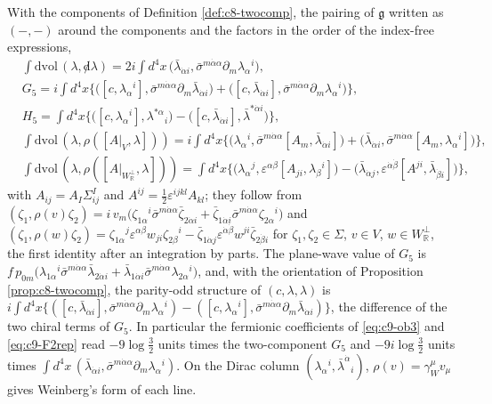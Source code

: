 \begin{remark}
\label{rem:c9-twocomp3}
With the components of Definition \ref{def:c8-twocomp}, the pairing of $\mathfrak g$ written as $(-,-)$ around the components and the factors in the order of the index-free expressions,
\[
\begin{aligned}
&\int\mathrm{dvol}\,(\lambda,{\not d}\lambda)=2i\int d^4x\,\big(\bar\lambda_{\dot\alpha i},\bar\sigma^{m\dot\alpha\alpha}\partial_m\lambda_\alpha{}^i\big),\\
&G_5=i\int d^4x\Big\{\big([c,\lambda_\alpha{}^i],\bar\sigma^{m\dot\alpha\alpha}\partial_m\bar\lambda_{\dot\alpha i}\big)+\big([c,\bar\lambda_{\dot\alpha i}],\bar\sigma^{m\dot\alpha\alpha}\partial_m\lambda_\alpha{}^i\big)\Big\},\\
&H_5=\int d^4x\Big\{\big([c,\lambda_\alpha{}^i],\lambda^{*\alpha}{}_i\big)-\big([c,\bar\lambda_{\dot\alpha i}],\bar\lambda^{*\dot\alpha i}\big)\Big\},\\
&\int\mathrm{dvol}\,(\lambda,\rho([A|_V,\lambda]))=i\int d^4x\Big\{\big(\lambda_\alpha{}^i,\bar\sigma^{m\dot\alpha\alpha}[A_m,\bar\lambda_{\dot\alpha i}]\big)+\big(\bar\lambda_{\dot\alpha i},\bar\sigma^{m\dot\alpha\alpha}[A_m,\lambda_\alpha{}^i]\big)\Big\},\\
&\int\mathrm{dvol}\,(\lambda,\rho([A|_{W_{\mathbb R}^\perp},\lambda]))=\int d^4x\Big\{\big(\lambda_\alpha{}^j,\varepsilon^{\alpha\beta}[A_{ji},\lambda_\beta{}^i]\big)-\big(\bar\lambda_{\dot\alpha j},\varepsilon^{\dot\alpha\dot\beta}[A^{ji},\bar\lambda_{\dot\beta i}]\big)\Big\},
\end{aligned}
\]
with $A_{ij}=A_I\Sigma^I_{ij}$ and $A^{ij}=\tfrac12\varepsilon^{ijkl}A_{kl}$; they follow from $(\zeta_1,\rho(v)\zeta_2)=i\,v_m\big(\zeta_{1\alpha}{}^i\bar\sigma^{m\dot\alpha\alpha}\bar\zeta_{2\dot\alpha i}+\bar\zeta_{1\dot\alpha i}\bar\sigma^{m\dot\alpha\alpha}\zeta_{2\alpha}{}^i\big)$ and $(\zeta_1,\rho(w)\zeta_2)=\zeta_{1\alpha}{}^j\varepsilon^{\alpha\beta}w_{ji}\zeta_{2\beta}{}^i-\bar\zeta_{1\dot\alpha j}\varepsilon^{\dot\alpha\dot\beta}w^{ji}\bar\zeta_{2\dot\beta i}$ for $\zeta_1,\zeta_2\in\Sigma$, $v\in V$, $w\in W_{\mathbb R}^\perp$, the first identity after an integration by parts. The plane-wave value of $G_5$ is $f\,p_{0m}\big(\lambda_{1\alpha}{}^i\bar\sigma^{m\dot\alpha\alpha}\bar\lambda_{2\dot\alpha i}+\bar\lambda_{1\dot\alpha i}\bar\sigma^{m\dot\alpha\alpha}\lambda_{2\alpha}{}^i\big)$, and, with the orientation of Proposition \ref{prop:c8-twocomp}, the parity-odd structure of $(c,\lambda,\lambda)$ is $i\int d^4x\big\{([c,\bar\lambda_{\dot\alpha i}],\bar\sigma^{m\dot\alpha\alpha}\partial_m\lambda_\alpha{}^i)-([c,\lambda_\alpha{}^i],\bar\sigma^{m\dot\alpha\alpha}\partial_m\bar\lambda_{\dot\alpha i})\big\}$, the difference of the two chiral terms of $G_5$. In particular the fermionic coefficients of \eqref{eq:c9-ob3} and \eqref{eq:c9-F2rep} read $-9\log\tfrac32$ units times the two-component $G_5$ and $-9i\log\tfrac32$ units times $\int d^4x\,(\bar\lambda_{\dot\alpha i},\bar\sigma^{m\dot\alpha\alpha}\partial_m\lambda_\alpha{}^i)$. On the Dirac column $(\lambda_\alpha{}^i,\bar\lambda^{\dot\alpha}{}_i)$, $\rho(v)=\gamma_W^\mu v_\mu$ gives Weinberg's form of each line.
\end{remark}

